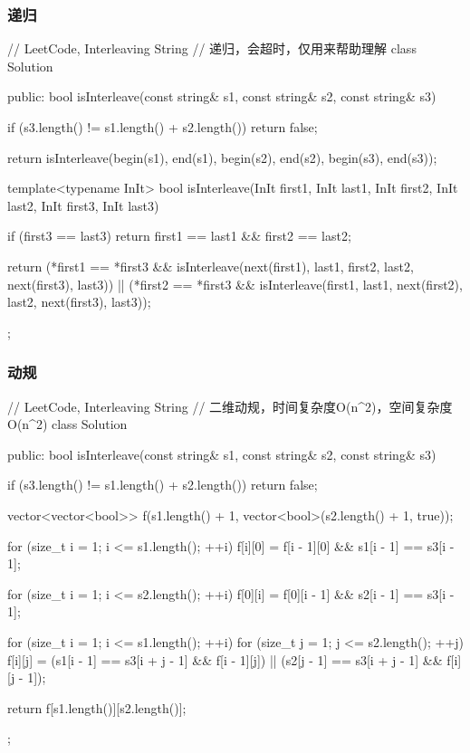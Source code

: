 \subsubsection{递归}
\begin{Code}
// LeetCode, Interleaving String
// 递归，会超时，仅用来帮助理解
class Solution {
public:
    bool isInterleave(const string& s1, const string& s2, const string& s3) {
        if (s3.length() != s1.length() + s2.length())
            return false;

        return isInterleave(begin(s1), end(s1), begin(s2), end(s2),
                begin(s3), end(s3));
    }

    template<typename InIt>
    bool isInterleave(InIt first1, InIt last1, InIt first2, InIt last2,
            InIt first3, InIt last3) {
        if (first3 == last3)
            return first1 == last1 && first2 == last2;

        return (*first1 == *first3
                && isInterleave(next(first1), last1, first2, last2,
                        next(first3), last3))
                || (*first2 == *first3
                        && isInterleave(first1, last1, next(first2), last2,
                                next(first3), last3));
    }
};
\end{Code}


\subsubsection{动规}
\begin{Code}
// LeetCode, Interleaving String
// 二维动规，时间复杂度O(n^2)，空间复杂度O(n^2)
class Solution {
public:
    bool isInterleave(const string& s1, const string& s2, const string& s3) {
        if (s3.length() != s1.length() + s2.length())
            return false;

        vector<vector<bool>> f(s1.length() + 1,
                vector<bool>(s2.length() + 1, true));

        for (size_t i = 1; i <= s1.length(); ++i)
            f[i][0] = f[i - 1][0] && s1[i - 1] == s3[i - 1];

        for (size_t i = 1; i <= s2.length(); ++i)
            f[0][i] = f[0][i - 1] && s2[i - 1] == s3[i - 1];

        for (size_t i = 1; i <= s1.length(); ++i)
            for (size_t j = 1; j <= s2.length(); ++j)
                f[i][j] = (s1[i - 1] == s3[i + j - 1] && f[i - 1][j])
                        || (s2[j - 1] == s3[i + j - 1] && f[i][j - 1]);

        return f[s1.length()][s2.length()];
    }
};
\end{Code}


